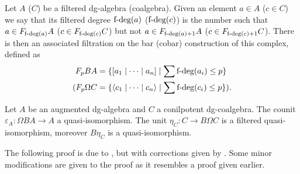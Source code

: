 \documentclass[../thesis.tex]{subfiles}
\begin{document}
            Let $A$ ($C$) be a filtered dg-algebra (coalgebra). Given an element $a\in A$ ($c\in C$) we say that its filtered degree $\tt{f-deg}(a)$ ($\tt{f-deg}(c)$) is the number such that $a\in F_{\tt{f-deg}(a)}A$ ($c\in F_{\tt{f-deg}(c)}C$) but not $a\in F_{\tt{f-deg}(a)+1}A$ ($c\in F_{\tt{f-deg}(c)+1}C$). There is then an associated filtration on the bar (cobar) construction of this complex, defined as 
            \begin{align*}
                F_pBA & = \startset{[ a_1 \mid \cdots \mid a_n ] \mid \sum \tt{f-deg}(a_i)\leq p} \\
                (F_p\Omega C & = \startset{\langle c_1 \mid \cdots \mid c_n \rangle \mid \sum \tt{f-deg}(c_i) \leq p})\tt{.}
            \end{align*}

            \begin{proposition}\label{prop: unit-counit-qif}
                Let $A$ be an augmented dg-algebra and $C$ a conilpotent dg-coalgebra. The counit $\varepsilon_A : \Omega BA \rightarrow A$ a quasi-isomorphism. The unit $\eta_C : C \rightarrow B\Omega C$ is a filtered quasi-isomorphism, moreover $B\eta_C$ is a quasi-isomorphism.
            \end{proposition}

            The following proof is due to \cite{LefevreHasegawa03}, but with corrections given by \cite{Keller05}. Some minor modifications are given to the proof as it resembles a proof given earlier.
\end{document}
